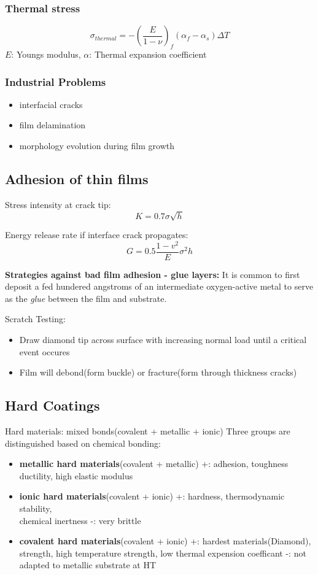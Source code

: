 \subsubsection{Thermal stress}
\[
\sigma_{thermal} = - \left( \frac{E}{1 - \nu} \right)_f (\alpha_f - \alpha_s) \Delta T
\]
\(E\): Youngs modulus, \(\alpha\): Thermal expansion coefficient

\subsubsection{Industrial Problems}
\begin{itemize}
    \item interfacial cracks
    \item film delamination 
    \item morphology evolution during film growth 
\end{itemize}
\subsection{Adhesion of thin films}

Stress intensity at crack tip:
\[
K = 0.7 \sigma\sqrt{h}
\]

Energy release rate if interface crack propagates:
\[
G = 0.5 \frac{1-v^2}{E}\sigma^2 h
\]

\textbf{Strategies against bad film adhesion - glue layers:} It is common to first deposit a fed hundered angstroms of an intermediate oxygen-active metal to serve as the \textit{glue} between the film and substrate.

Scratch Testing:
\begin{itemize}
    \item Draw diamond tip across surface with increasing normal load until a critical event occures
    \item Film will debond(form buckle) or fracture(form through thickness cracks)
\end{itemize}

\subsection{Hard Coatings}
Hard materials: mixed bonds(covalent + metallic + ionic)
Three groups are distinguished based on chemical bonding:
\begin{itemize}
    \item \textbf{metallic hard materials}(covalent + metallic)
    \subitem +: adhesion, toughness ductility, high elastic modulus
    \item \textbf{ionic hard materials}(covalent + ionic)
    \subitem +: hardness, thermodynamic stability, \\chemical inertness
    \subitem -: very brittle
    \item \textbf{covalent hard materials}(covalent + ionic)
    \subitem +: hardest materials(Diamond), strength, high temperature strength, low thermal expension coefficant
    \subitem -: not adapted to metallic substrate at HT
\end{itemize}

